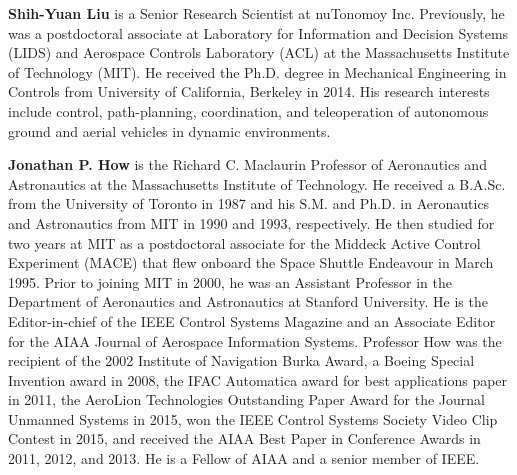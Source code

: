 \documentclass[letterpaper,12pt,peerreviewca,draftcls]{IEEEtran}
\begin{document}
\noindent \textbf{Shih-Yuan Liu} is a Senior Research Scientist at nuTonomoy Inc. Previously, he was a postdoctoral associate at Laboratory for Information and Decision Systems (LIDS) and Aerospace Controls Laboratory (ACL) at the Massachusetts Institute of Technology (MIT). He received the Ph.D. degree in Mechanical Engineering in Controls from University of California, Berkeley in 2014. His research interests include control, path-planning, coordination, and teleoperation of autonomous ground and aerial vehicles in dynamic environments.


\noindent \textbf{Jonathan P. How} is the Richard C. Maclaurin Professor of Aeronautics and Astronautics at the Massachusetts Institute of Technology. He received a B.A.Sc. from the University of Toronto in 1987 and his S.M. and Ph.D. in Aeronautics and Astronautics from MIT in 1990 and 1993, respectively. He then studied for two years at MIT as a postdoctoral associate for the Middeck Active Control Experiment (MACE) that flew onboard the Space Shuttle Endeavour in March 1995. Prior to joining MIT in 2000, he was an Assistant Professor in the Department of Aeronautics and Astronautics at Stanford University. He is the Editor-in-chief of the IEEE Control Systems Magazine and an Associate Editor for the AIAA Journal of Aerospace Information Systems. Professor How was the recipient of the 2002 Institute of Navigation Burka Award, a Boeing Special Invention award in 2008, the IFAC Automatica award for best applications paper in 2011, the AeroLion Technologies Outstanding Paper Award for the Journal Unmanned Systems in 2015, won the IEEE Control Systems Society Video Clip Contest in 2015, and received the AIAA Best Paper in Conference Awards in 2011, 2012, and 2013. He is a Fellow of AIAA and a senior member of IEEE.
\end{document}
